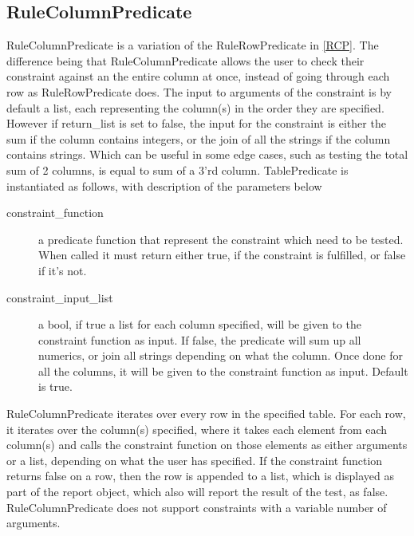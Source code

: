 \subsection{RuleColumnPredicate}
RuleColumnPredicate is a variation of the RuleRowPredicate in \cref{RCP}. The difference being that RuleColumnPredicate allows the user to check their constraint against an the entire column at once, instead of going through each row as RuleRowPredicate does. The input to arguments of the constraint is by default a list, each representing the column(s) in the order they are specified. However if return\_list is set to false, the input for the constraint is either the sum if the column contains integers, or the join of all the strings if the column contains strings. Which can be useful in some edge cases, such as testing the total sum of 2 columns, is equal to sum of a 3'rd column. TablePredicate is instantiated as follows, with description of the parameters below


\begin{description}
\item [constraint\_function] a predicate function that represent the constraint which need to be tested. When called it must return either true, if the constraint is fulfilled, or false if it's not.
\item [constraint\_input\_list] a bool, if true a list for each column specified, will be given to the constraint function as input. If false, the predicate will sum up all numerics, or join all strings depending on what the column. Once done for all the columns, it will be given to the constraint function as input. Default is true.
\end{description}

RuleColumnPredicate iterates over every row in the specified table. For each row, it iterates over the column(s) specified, where it takes each element from each column(s) and calls the constraint function on those elements as either arguments or a list, depending on what the user has specified. If the constraint function returns false on a row, then the row is appended to a list, which is displayed as part of the report object, which also will report the result of the test, as false. RuleColumnPredicate does not support constraints with a variable number of arguments.
